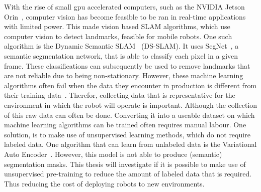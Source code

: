 With the rise of small gpu accelerated computers, such as the NVIDIA Jetson Orin~\cite{NVIDIA_Karumbunathan_2022}, computer vision has become feasible to be ran in real-time applications with limited power. This made vision based SLAM algorithms, which use computer vision to detect landmarks, feasible for mobile robots. One such algorithm is the Dynamic Semantic SLAM~\cite{yu2018ds} (DS-SLAM). It uses SegNet~\cite{badri2017segnet}, a semantic segmentation network, that is able to classify each pixel in a given frame. These classifications can subsequently be used to remove landmarks that are not reliable due to being non-stationary. However, these machine learning algorithms often fail when the data they encounter in production is different from their training data~\cite{Goodfellow-et-al-2016,ozdag2018adversarial,warde201611,10.14778/3632093.3632098,DBLP:journals/corr/KurakinGB16a,10.1145/3422622}. Therefor, collecting data that is representative for the environment in which the robot will operate is important. Although the collection of this raw data can often be done. Converting it into a useable dataset on which machine learning algorithms can be trained often requires manual labour. One solution, is to make use of unsupervised learning methods, which do not require labeled data. One algorithm that can learn from unlabeled data is the Variational Auto Encoder~\cite{kingma2014autoencodingvariationalbayes}. However, this model is not able to produce (semantic) segmentation masks. This thesis will investigate if it is possible to make use of unsupervised pre-training to reduce the amount of labeled data that is required. Thus reducing the cost of deploying robots to new environments.

